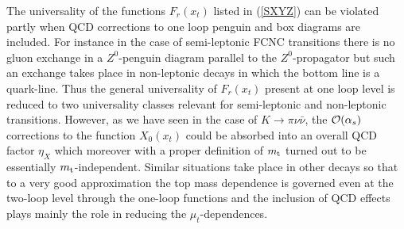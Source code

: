 \documentclass[12pt,rotate]{article}
\def\as{\alpha_s}
\newcommand{\mt}{m_{\rm t}}
\newcommand{\ord}{{\cal O}}
\begin{document}
\begin{itemize}
\begin{itemize}
The universality of the functions $F_r(x_t)$ listed in (\ref{SXYZ})
can be violated partly when QCD corrections to one loop penguin
and box diagrams are included. For instance in the case of
semi-leptonic FCNC transitions there is no gluon exchange in
a $Z^0$-penguin diagram parallel to the $Z^0$-propagator but
such an exchange takes place in non-leptonic decays in which the
bottom line is a quark-line. Thus the general universality of $F_r(x_t)$
present at one loop level is reduced to two universality classes
relevant for semi-leptonic and non-leptonic transitions.
However, as we have seen in the case of $K\to\pi\nu\bar\nu$,
the $\ord(\as)$ corrections to the function $X_0(x_t)$ could
be absorbed into an overall QCD factor $\eta_X$ which moreover
with a proper definition of $\mt$ turned out to be essentially
$\mt$-independent. Similar situations take place in other decays
so that to a very good approximation the top mass dependence is
governed even at the two-loop level through the one-loop functions
and the inclusion of QCD effects plays mainly the role in reducing 
the $\mu_t$-dependences.


\end{itemize}
\end{itemize}
\end{document}
